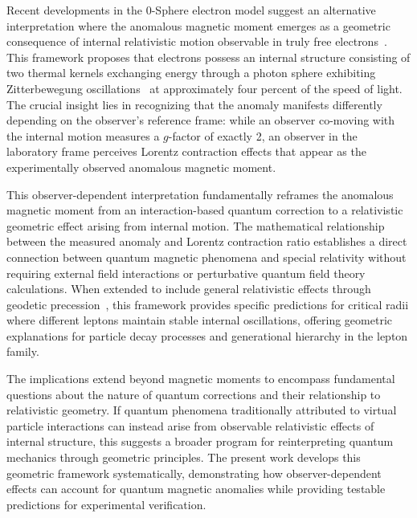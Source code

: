 \documentclass[%
 reprint,
 amsmath,amssymb,
 aps,
]{revtex4-1}
\numberwithin{equation}{section}%
\begin{document}
Recent developments in the 0-Sphere electron model suggest an alternative interpretation where the anomalous magnetic moment emerges as a geometric consequence of internal relativistic motion observable in truly free electrons~\cite{hanamura2018}. This framework proposes that electrons possess an internal structure consisting of two thermal kernels exchanging energy through a photon sphere exhibiting Zitterbewegung oscillations~\cite{schrodinger1930} at approximately four percent of the speed of light. The crucial insight lies in recognizing that the anomaly manifests differently depending on the observer's reference frame: while an observer co-moving with the internal motion measures a $g$-factor of exactly 2, an observer in the laboratory frame perceives Lorentz contraction effects that appear as the experimentally observed anomalous magnetic moment.

This observer-dependent interpretation fundamentally reframes the anomalous magnetic moment from an interaction-based quantum correction to a relativistic geometric effect arising from internal motion. The mathematical relationship between the measured anomaly and Lorentz contraction ratio establishes a direct connection between quantum magnetic phenomena and special relativity without requiring external field interactions or perturbative quantum field theory calculations. When extended to include general relativistic effects through geodetic precession~\cite{thomas1926,thomas1927}, this framework provides specific predictions for critical radii where different leptons maintain stable internal oscillations, offering geometric explanations for particle decay processes and generational hierarchy in the lepton family.

The implications extend beyond magnetic moments to encompass fundamental questions about the nature of quantum corrections and their relationship to relativistic geometry. If quantum phenomena traditionally attributed to virtual particle interactions can instead arise from observable relativistic effects of internal structure, this suggests a broader program for reinterpreting quantum mechanics through geometric principles. The present work develops this geometric framework systematically, demonstrating how observer-dependent effects can account for quantum magnetic anomalies while providing testable predictions for experimental verification.

\clearpage
\end{document}

